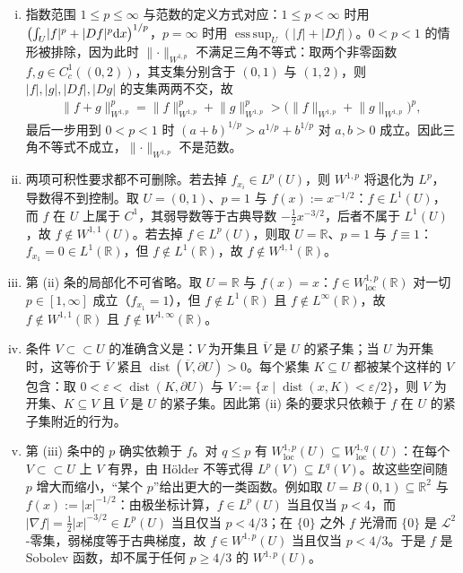 \documentclass[../../main.tex]{subfiles}%
\begin{document}
\begin{remark}\label{remark:ch04-def-4-2-条件}
\begin{enumerate}[(i)]
\item 指数范围 $1\leqslant p\leqslant\infty$ 与范数的定义方式对应：$1\leqslant p<\infty$ 时用 $\bigl(\int_{U}\lvert f\rvert^{p}+\lvert Df\rvert^{p}\mathrm{d} x\bigr)^{1/p}$，$p=\infty$ 时用 $\operatorname*{ess\,sup}_{U}(\lvert f\rvert+\lvert Df\rvert)$。$0<p<1$ 的情形被排除，因为此时 $\lVert\cdot\rVert_{W^{1,p}}$ 不满足三角不等式：取两个非零函数 $f,g\in C_c^{1}((0,2))$，其支集分别含于 $(0,1)$ 与 $(1,2)$，则 $\lvert f\rvert,\lvert g\rvert,\lvert Df\rvert,\lvert Dg\rvert$ 的支集两两不交，故
\begin{align*}
\lVert f+g\rVert_{W^{1,p}}^{p}=\lVert f\rVert_{W^{1,p}}^{p}+\lVert g\rVert_{W^{1,p}}^{p}>\bigl(\lVert f\rVert_{W^{1,p}}+\lVert g\rVert_{W^{1,p}}\bigr)^{p},
\end{align*}
最后一步用到 $0<p<1$ 时 $(a+b)^{1/p}>a^{1/p}+b^{1/p}$ 对 $a,b>0$ 成立。因此三角不等式不成立，$\lVert\cdot\rVert_{W^{1,p}}$ 不是范数。
\item 两项可积性要求都不可删除。若去掉 $f_{x_i}\in L^{p}(U)$，则 $W^{1,p}$ 将退化为 $L^{p}$，导数得不到控制。取 $U=(0,1)$、$p=1$ 与 $f(x):=x^{-1/2}$：$f\in L^{1}(U)$，而 $f$ 在 $U$ 上属于 $C^{1}$，其弱导数等于古典导数 $-\frac{1}{2}x^{-3/2}$，后者不属于 $L^{1}(U)$，故 $f\notin W^{1,1}(U)$。若去掉 $f\in L^{p}(U)$，则取 $U=\mathbb{R}$、$p=1$ 与 $f\equiv1$：$f_{x_1}=0\in L^{1}(\mathbb{R})$，但 $f\notin L^{1}(\mathbb{R})$，故 $f\notin W^{1,1}(\mathbb{R})$。
\item 第 (ii) 条的局部化不可省略。取 $U=\mathbb{R}$ 与 $f(x)=x$：$f\in W^{1,p}_{\mathrm{loc}}(\mathbb{R})$ 对一切 $p\in[1,\infty]$ 成立（$f_{x_1}=1$），但 $f\notin L^{1}(\mathbb{R})$ 且 $f\notin L^{\infty}(\mathbb{R})$，故 $f\notin W^{1,1}(\mathbb{R})$ 且 $f\notin W^{1,\infty}(\mathbb{R})$。
\item 条件 $V\subset\subset U$ 的准确含义是：$V$ 为开集且 $\overline{V}$ 是 $U$ 的紧子集；当 $U$ 为开集时，这等价于 $\overline{V}$ 紧且 $\operatorname{dist}(\overline{V},\partial U)>0$。每个紧集 $K\subseteq U$ 都被某个这样的 $V$ 包含：取 $0<\varepsilon<\operatorname{dist}(K,\partial U)$ 与 $V:=\{x\mid\operatorname{dist}(x,K)<\varepsilon/2\}$，则 $V$ 为开集、$K\subseteq V$ 且 $\overline{V}$ 是 $U$ 的紧子集。因此第 (ii) 条的要求只依赖于 $f$ 在 $U$ 的紧子集附近的行为。
\item 第 (iii) 条中的 $p$ 确实依赖于 $f$。对 $q\leqslant p$ 有 $W^{1,p}_{\mathrm{loc}}(U)\subseteq W^{1,q}_{\mathrm{loc}}(U)$：在每个 $V\subset\subset U$ 上 $V$ 有界，由 Hölder 不等式得 $L^{p}(V)\subseteq L^{q}(V)$。故这些空间随 $p$ 增大而缩小，“某个 $p$”给出更大的一类函数。例如取 $U=B(0,1)\subseteq\mathbb{R}^{2}$ 与 $f(x):=\lvert x\rvert^{-1/2}$：由极坐标计算，$f\in L^{p}(U)$ 当且仅当 $p<4$，而 $\lvert\nabla f\rvert=\frac{1}{2}\lvert x\rvert^{-3/2}\in L^{p}(U)$ 当且仅当 $p<4/3$；在 $\{0\}$ 之外 $f$ 光滑而 $\{0\}$ 是 $\mathcal{L}^{2}$-零集，弱梯度等于古典梯度，故 $f\in W^{1,p}(U)$ 当且仅当 $p<4/3$。于是 $f$ 是 Sobolev 函数，却不属于任何 $p\geqslant4/3$ 的 $W^{1,p}(U)$。

\end{enumerate}
\end{remark}
\end{document}
